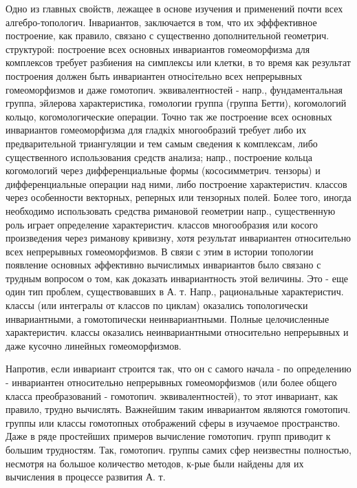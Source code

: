 \documentclass[10pt]{article}
\begin{document}
Одно из главных свойств, лежащее в основе изучения и применений почти всех алгебро-топологич. Інвариантов, заключается в том, что их эфффективное построение, как правило, связано с существенно дополнительной геометрич. структурой: построение всех основных инвариантов гомеоморфизма для комплексов требует разбиения на симплексы или клетки, в то время как результат построения должен быть инвариантен относітельно всех непрерывных гомеоморфизмов и даже гомотопич. эквивалентностей - напр., фундаментальная группа, эйлерова характеристика, гомологии группа (группа Бетти), когомологий кольцо, когомологические операции. Точно так же построение всех основных инвариантов гомеоморфизма для гладкіх многообразий требует либо их предварительной триангуляции и тем самым сведения к комплексам, либо существенного использования средств анализа; напр., построение кольца когомологий через дифференциальные формы (кососимметрич. тензоры) и дифференциальные операции над ними, либо построение характеристич. классов через особенности векторных, реперных или тензорных полей. Более того, иногда необходимо использовать средства римановой геометрии напр., существенную роль играет определение характеристич. классов многообразия или косого произведения через риманову кривизну, хотя результат инвариантен относительно всех непрерывных гомеоморфизмов. В связи с этим в истории топологии появление основных әффективно вычислимых инвариантов было связано с трудным вопросом о том, как доказать инвариантность этой величины. Это - еще один тип проблем, существовавших в А. т. Напр., рациональные характеристич. классы (или интегралы от классов по циклам) оказались топологически инвариантными, а гомотопически неинвариантными. Полные целочисленные характеристич. классы оказались неинвариантными относительно непрерывных и даже кусочно линейных гомеоморфизмов.



Напротив, если инвариант строится так, что он с самого начала - по определению - инвариантен относительно непрерывных гомеоморфизмов (или более общего класса преобразований - гомотопич. эквивалентностей), то этот инвариант, как правило, трудно вычислять. Важнейшим таким инвариантом являются гомотопич. группы или классы гомотопных отображений сферы в изучаемое пространство. Даже в ряде простейших примеров вычисление гомотопич. групп приводит к большим трудностям. Так, гомотопич. группы самих сфер неизвестны полностью, несмотря на большое количество методов, к-рые были найдены для их вычисления в процессе развития А. т.
\end{document}
